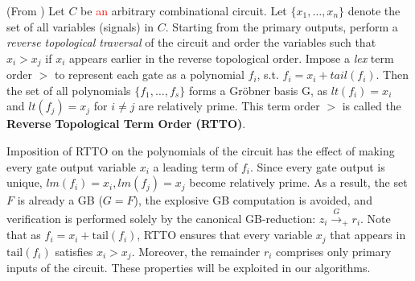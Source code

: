\begin{Proposition} \label{prop:top-order}
(From \cite{lv:tcad2013}) Let $C$ be \textcolor{red}{an} arbitrary combinational
  circuit. Let $\{x_1, \dots, x_n\}$ denote the set of all variables
  (signals) in $C$. Starting from the primary outputs, perform
  a {\it reverse topological traversal} of the circuit and order the
  variables such that $x_i > x_j$ if $x_i$ appears earlier in the
  reverse topological order. Impose a {\it lex} term order $>$ to
  represent each gate as a polynomial $f_i$, s.t. $f_i = x_i +
  tail(f_i)$. Then the set of all polynomials  $\{f_1, \dots, f_s\}$
  forms a Gr\"obner basis G, as $lt(f_i)=x_i$ and $lt(f_j)=x_j$ for
  $i\neq j$ are relatively prime. This term order $>$ is called the 
  {\bf Reverse Topological Term Order (RTTO)}.
\end{Proposition}

Imposition of RTTO on the polynomials of the circuit has the effect of
making every gate output variable $x_i$ a leading term of
$f_i$. Since every gate output is unique, $lm(f_i)=x_i, lm(f_j)=x_j$
become relatively prime. As a result, the set $F$ is already a GB
($G=F$), the explosive GB computation is avoided, and verification is
performed solely by the canonical GB-reduction: $z_i \xrightarrow{G}_+r_i$. 
Note that as $f_i = x_i + \text{tail}(f_i)$, RTTO ensures that
every variable $x_j$ that appears in $\text{tail}(f_i)$ satisfies
$x_i>x_j$. Moreover, the remainder $r_i$ comprises only primary inputs
of the circuit. These properties will be exploited in our algorithms.

